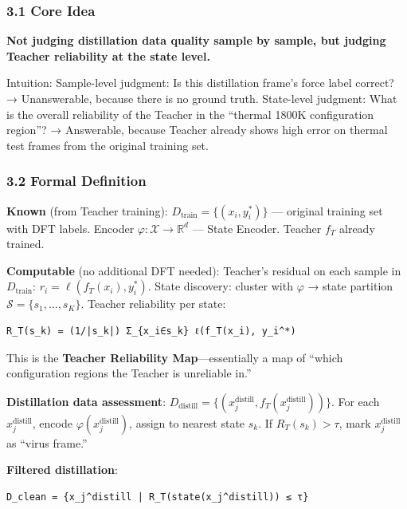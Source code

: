 \documentclass[
  12pt,
]{article}
\begin{document}
\subsubsection{3.1 Core Idea}\label{core-idea}

\textbf{Not judging distillation data quality sample by sample, but judging Teacher reliability at the state level.}

Intuition: Sample-level judgment: Is this distillation frame's force label correct? → Unanswerable, because there is no ground truth. State-level judgment: What is the overall reliability of the Teacher in the ``thermal 1800K configuration region''? → Answerable, because Teacher already shows high error on thermal test frames from the original training set.

\subsubsection{3.2 Formal Definition}\label{formal-definition}

\textbf{Known} (from Teacher training): $D_{\text{train}} = \{(x_i, y_i^*)\}$ --- original training set with DFT labels. Encoder $\varphi: \mathcal{X} \to \mathbb{R}^d$ --- State Encoder. Teacher $f_T$ already trained.

\textbf{Computable} (no additional DFT needed): Teacher's residual on each sample in $D_{\text{train}}$: $r_i = \ell(f_T(x_i), y_i^*)$. State discovery: cluster with $\varphi$ → state partition $\mathcal{S} = \{s_1, \ldots, s_K\}$. Teacher reliability per state:

\begin{verbatim}
R_T(s_k) = (1/|s_k|) Σ_{x_i∈s_k} ℓ(f_T(x_i), y_i^*)
\end{verbatim}

This is the \textbf{Teacher Reliability Map}---essentially a map of ``which configuration regions the Teacher is unreliable in.''

\textbf{Distillation data assessment}: $D_{\text{distill}} = \{(x_j^{\text{distill}}, f_T(x_j^{\text{distill}}))\}$. For each $x_j^{\text{distill}}$, encode $\varphi(x_j^{\text{distill}})$, assign to nearest state $s_k$. If $R_T(s_k) > \tau$, mark $x_j^{\text{distill}}$ as ``virus frame.''

\textbf{Filtered distillation}:

\begin{verbatim}
D_clean = {x_j^distill | R_T(state(x_j^distill)) ≤ τ}
\end{verbatim}
\end{document}
